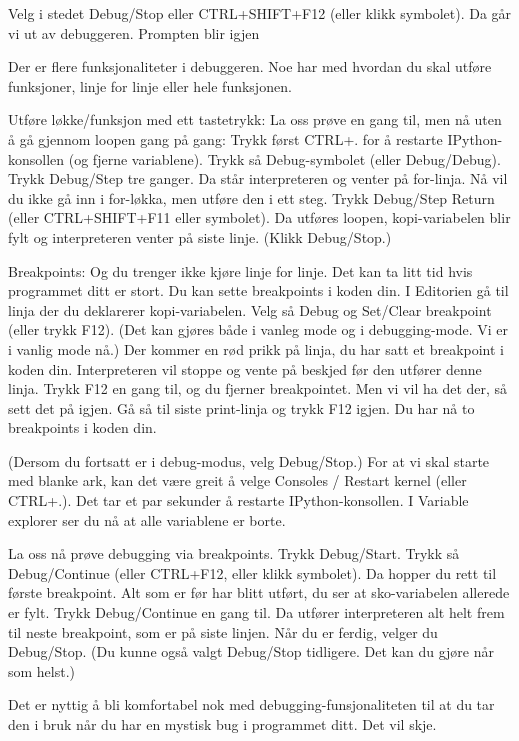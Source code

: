 {Velg i stedet Debug/Stop eller CTRL+SHIFT+F12 (eller klikk symbolet). Da går vi ut av debuggeren. Prompten blir igjen 

Der er flere funksjonaliteter i debuggeren. Noe har med hvordan du skal utføre funksjoner, linje for linje eller hele funksjonen.

Utføre løkke/funksjon med ett tastetrykk: 
La oss prøve en gang til, men nå uten å gå gjennom loopen gang på gang:
Trykk først CTRL+. for å restarte IPython-konsollen (og fjerne variablene).
Trykk så Debug-symbolet (eller Debug/Debug).
Trykk Debug/Step tre ganger.
Da står interpreteren og venter på for-linja. 
Nå vil du ikke gå inn i for-løkka, men utføre den i ett steg.
Trykk Debug/Step Return (eller CTRL+SHIFT+F11 eller symbolet).
Da utføres loopen, kopi-variabelen blir fylt og interpreteren venter på siste linje.
(Klikk Debug/Stop.)


Breakpoints: 
Og du trenger ikke kjøre linje for linje.
Det kan ta litt tid hvis programmet ditt er stort. 
Du kan sette breakpoints i koden din.
I Editorien gå til linja der du deklarerer kopi-variabelen.
Velg så Debug og Set/Clear breakpoint (eller trykk F12).
(Det kan gjøres både i vanleg mode og i debugging-mode. Vi er i vanlig mode nå.) 
Der kommer en rød prikk på linja, du har satt et breakpoint i koden din.
Interpreteren vil stoppe og vente på beskjed før den utfører denne linja. 
Trykk F12 en gang til, og du fjerner breakpointet.
Men vi vil ha det der, så sett det på igjen.
Gå så til siste print-linja og trykk F12 igjen.
Du har nå to breakpoints i koden din.

(Dersom du fortsatt er i debug-modus, velg Debug/Stop.)
For at vi skal starte med blanke ark, kan det være greit å velge
Consoles / Restart kernel (eller CTRL+.).
Det tar et par sekunder å restarte IPython-konsollen.
I Variable explorer ser du nå at alle variablene er borte.

La oss nå prøve debugging via breakpoints.
Trykk Debug/Start.
Trykk så Debug/Continue (eller CTRL+F12, eller klikk symbolet). 
Da hopper du rett til første breakpoint. 
Alt som er før har blitt utført, du ser at sko-variabelen allerede er fylt.
Trykk Debug/Continue en gang til.
Da utfører interpreteren alt helt frem til neste breakpoint, som er på siste linjen.
Når du er ferdig, velger du Debug/Stop.
(Du kunne også valgt Debug/Stop tidligere. Det kan du gjøre når som helst.) 

Det er nyttig å bli komfortabel nok med debugging-funsjonaliteten til at du
tar den i bruk når du har en mystisk bug i programmet ditt.
Det vil skje. 

}
